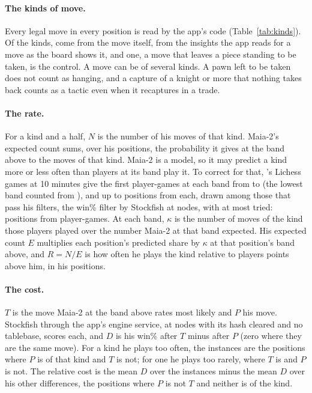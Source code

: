 \documentclass[11pt]{article}
\begin{document}
\paragraph{The kinds of move.} Every legal move in every position is read by the app's code
(Table~\ref{tab:kinds}). Of the \Kinds{} kinds, \MoveKinds{} come from the move itself,
\IdeaKinds{} from the insights the app reads for a move as the board shows it, and one, a move
that leaves a piece standing to be taken, is the control. A move can be of several kinds. A pawn left to be taken
does not count as hanging, and a capture of a knight or more that nothing takes back counts as a
tactic even when it recaptures in a trade.

\KindTable

\paragraph{The rate.} For a kind and a half, $N$ is the number of his moves of that kind. Maia-2's
expected count sums, over his positions, the probability it gives at the band above to the moves
of that kind. Maia-2 is a model, so it may predict a kind more or less often than players at its
band play it. To correct for that, \LichessMonth's Lichess games at 10 minutes give the first
\PerBand{} player-games at each band from \BandLowest{} to \BandHighest{} (the lowest band counted
from \LichessFloor), and up to \PerPlayer{} positions from each, drawn among those that pass his
filters, the win\% filter by Stockfish at \FilterNodes{} nodes, with at most \Tries{} tried:
\LichessPositions{} positions from \LichessWithPositions{} player-games. At each band, $\kappa$ is
the number of moves of the kind those players played over the number Maia-2 at that band
expected. His expected count $E$ multiplies each position's predicted share by $\kappa$ at that
position's band above, and $R = N/E$ is how often he plays the kind relative to players
\Above{} points above him, in his positions.

\paragraph{The cost.} $T$ is the move Maia-2 at the band above rates most likely and $P$ his move.
Stockfish through the app's engine service, at \CostNodes{} nodes with its hash cleared and no
tablebase, scores each, and $D$ is his win\% after $T$ minus after $P$ (zero where they are the
same move). For a kind he plays too often, the instances are the positions where $P$ is of that
kind and $T$ is not; for one he plays too rarely, where $T$ is and $P$ is not. The relative cost
is the mean $D$ over the instances minus the mean $D$ over his other differences, the positions
where $P$ is not $T$ and neither is of the kind.
\end{document}
